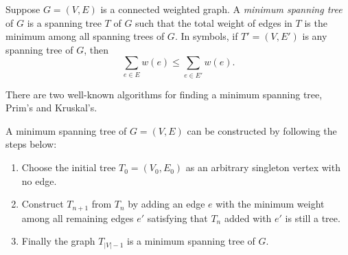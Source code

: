 \begin{definition}
    Suppose $G=(V,E)$ is a connected weighted graph. A \emph{minimum spanning tree} of $G$ is a spanning tree $T$ of $G$ such that the total weight of edges in $T$ is the minimum among all spanning trees of $G$. In symbols, if $T'=(V,E')$ is any spanning tree of $G$, then \[\sum_{e\in E}w(e)\leq \sum_{e\in E'}w(e).\]
\end{definition}

There are two well-known algorithms for finding a minimum spanning tree, Prim's and Kruskal's. 

\begin{algo}
    A minimum spanning tree of $G=(V,E)$ can be constructed by following the steps below:
    \begin{enumerate}[itemindent=0ex, itemsep=0pt, label=\upshape{(\alph*)}]
        \item Choose the initial tree $T_0=(V_0,E_0)$ as an arbitrary singleton vertex with no edge.
        \item Construct $T_{n+1}$ from $T_n$ by adding an edge $e$ with the minimum weight among all remaining edges $e'$ satisfying that $T_n$ added with $e'$ is still a tree.
        \item Finally the graph $T_{|V|-1}$ is a minimum spanning tree of $G$.
    \end{enumerate}
\end{algo}

